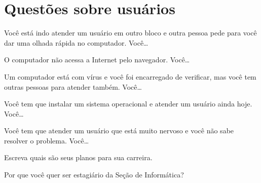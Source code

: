 \siheader
\section*{Questões sobre usuários}
\begin{questions}

\question
Você está indo atender um usuário em outro bloco e outra pessoa pede
para você dar uma olhada rápida no computador. Você\ldots
\vfill

\question
O computador não acessa a Internet pelo navegador. Você\ldots
\vfill

\question
Um computador está com vírus e você foi encarregado de verificar, mas
você tem outras pessoas para atender também. Você\ldots
\vfill

\question
Você tem que instalar um sistema operacional e atender um usuário ainda
hoje. Você\ldots
\vfill

\question
Você tem que atender um usuário que está muito nervoso e você não sabe
resolver o problema. Você\ldots
\vfill

\question
Escreva quais são seus planos para sua carreira.
\vfill

\question
Por que você quer ser estagiário da Seção de Informática?
\vfill

\end{questions}

